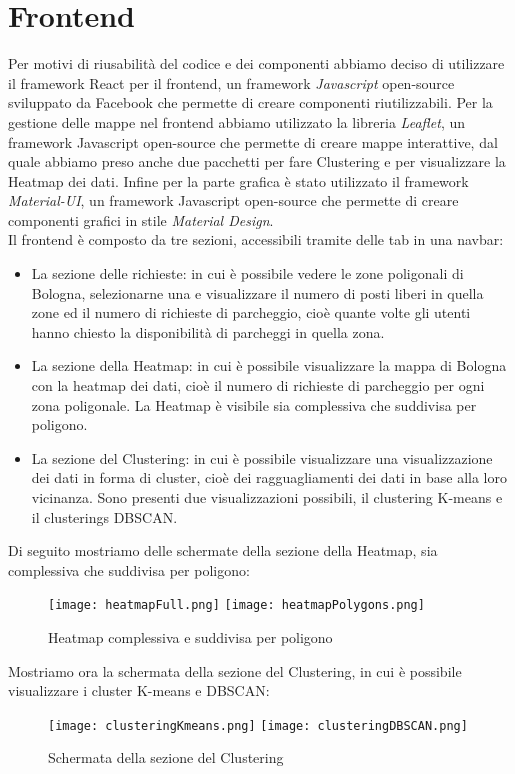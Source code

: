\documentclass[../../Report.tex]{subfiles}
\begin{document}
\section{Frontend}
    Per  motivi di riusabilità del codice e dei componenti abbiamo deciso di utilizzare il framework React per il frontend, un framework \emph{Javascript} open-source sviluppato da Facebook che permette di creare componenti riutilizzabili. 
    Per la gestione delle mappe nel frontend abbiamo utilizzato la libreria \emph{Leaflet}, un framework Javascript open-source che permette di creare mappe interattive, dal quale abbiamo preso anche due pacchetti per fare Clustering e per visualizzare la Heatmap dei dati. Infine per la parte grafica è stato utilizzato il framework \emph{Material-UI}, un framework Javascript open-source che permette di creare componenti grafici in stile \emph{Material Design}.\\
    Il frontend è composto da tre sezioni, accessibili tramite delle tab in una navbar: 
    \begin{itemize}
      \item La sezione delle richieste: in cui è possibile vedere le zone poligonali di Bologna, selezionarne una e visualizzare il numero di posti liberi in quella zone ed il numero di richieste di parcheggio, cioè quante volte gli utenti hanno chiesto la disponibilità di parcheggi in quella zona.
      \item La sezione della Heatmap: in cui è possibile visualizzare la mappa di Bologna con la heatmap dei dati, cioè il numero di richieste di parcheggio per ogni zona poligonale. La Heatmap è visibile sia complessiva che suddivisa per poligono.
      \item La sezione del Clustering: in cui è possibile visualizzare una visualizzazione dei dati in forma di cluster, cioè dei ragguagliamenti dei dati in base alla loro vicinanza. Sono presenti due visualizzazioni possibili, il clustering K-means e il clusterings DBSCAN. 
    \end{itemize}
    Di seguito mostriamo delle schermate della sezione della Heatmap, sia complessiva che suddivisa per poligono:
    \begin{figure}[H]
        \centering
        \texttt{[image: heatmapFull.png]}
        \texttt{[image: heatmapPolygons.png]}
        \caption{Heatmap complessiva e suddivisa per poligono}
        \label{fig:heatmap}
    \end{figure}
    Mostriamo ora la schermata della sezione del Clustering, in cui è possibile visualizzare i cluster K-means e DBSCAN:
    \begin{figure}[H]
        \centering
        \texttt{[image: clusteringKmeans.png]}
        \texttt{[image: clusteringDBSCAN.png]}
        \caption{Schermata della sezione del Clustering}
        \label{fig:clustering}
    \end{figure}
    

    
\end{document}
